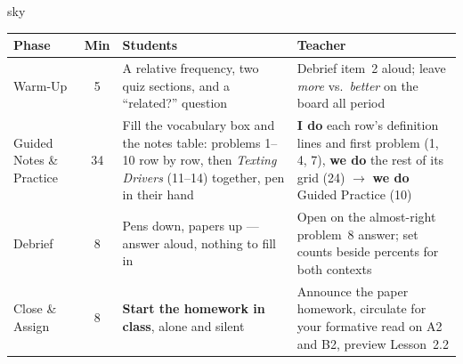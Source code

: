 \documentclass[10pt]{article}
\begin{document}
\boxguard[30]
\begin{skillbox}{sky}
\renewcommand{\arraystretch}{1.25}
\begin{tabularx}{\linewidth}{@{}l c X X@{}}
\textbf{Phase} & \textbf{Min} & \textbf{Students} & \textbf{Teacher} \\
\hline
Warm-Up & 5 & A relative frequency, two quiz sections, and a ``related?'' question & Debrief item~2 aloud; leave \emph{more} vs.\ \emph{better} on the board all period \\
Guided Notes \& Practice & 34 & Fill the vocabulary box and the notes table: problems 1--10 row by row, then \emph{Texting Drivers} (11--14) together, pen in their hand & \textbf{I do} each row's definition lines and first problem (1, 4, 7), \textbf{we do} the rest of its grid (24) $\to$ \textbf{we do} Guided Practice (10) \\
Debrief & 8 & Pens down, papers up --- answer aloud, nothing to fill in & Open on the almost-right problem~8 answer; set counts beside percents for both contexts \\
Close \& Assign & 8 & \textbf{Start the homework in class}, alone and silent & Announce the paper homework, circulate for your formative read on A2 and B2, preview Lesson~2.2 \\
\end{tabularx}
\end{skillbox}
\end{document}
